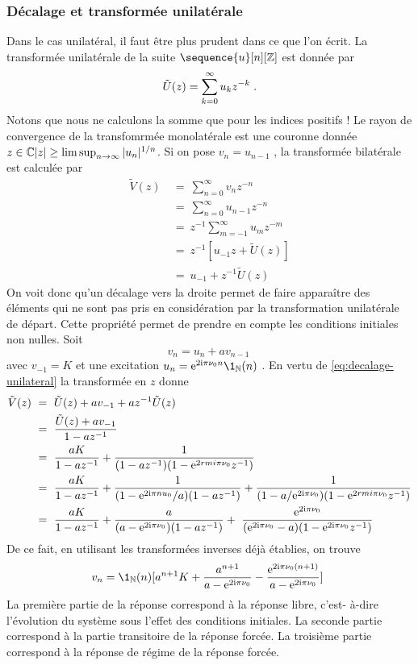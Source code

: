 \begin{proposition}
{\subsubsection{D\'{e}calage et transform\'{e}e unilat\'{e}rale}
Dans le cas unilat\'{e}ral, il faut \^{e}tre plus prudent dans ce que l'on \'{e}crit. La transformée unilatérale de la suite $\sequence{u}[n][\zset]$ est donnée par 
\begin{equation}
\label{eq:transformee-unilaterale}
\tilde{U}(z)= \sum_{k=0}^\infty u_k z^{-k}\;.
\end{equation}
Notons que nous ne calculons la somme que pour les indices positifs ! Le rayon de convergence de la transfomrmée monolatérale est une couronne 
donnée ${z \in \mathbb{C}}{|z| \geq \limsup_{n \to \infty} |u_n|^{1/n}}$. 
Si on pose $v_n=u_{n-1}$ , la transform\'{e}e bilat\'{e}rale est calcul\'{e}e par
\begin{align}
\nonumber
\tilde{V}(z)\ &=\ \sum_{n=0}^{\infty}v_nz^{-n} \\
\nonumber
&=\ \sum_{n=0}^{\infty}u_{n-1}z^{-n} \\
\nonumber
&=\ z^{-1}\sum_{m=-1}^{\infty} u_m z^{-m} \\
\nonumber
&=\ z^{-1}[u_{-1} z+\tilde{U}(z)] \\
&=\ u_{-1}+z^{-1}\tilde{U}(z)
\label{eq:decalage-unilateral}
\end{align}
On voit donc qu'un d\'{e}calage vers la droite permet de faire appara\^{i}tre des \'{e}l\'{e}ments qui ne sont pas pris en consid\'{e}ration par la transformation unilatérale de d\'{e}part. Cette propri\'{e}t\'{e} permet de prendre en compte les conditions initiales non nulles.
Soit
\[
v_n=u_n+av_{n-1}\
\]
avec $v_{-1}=K$ et une excitation $u_n=\rme^{2 \rmi \pi \nu_0 n} \1_{\nset}(n)$ . En vertu de \eqref{eq:decalage-unilateral}
la transform\'{e}e en $z$ donne
\begin{align*}
\tilde{V}(z)\ &=\ \tilde{U}(z)+av_{-1}+az^{-1}\tilde{U}(z) \\
&=\ \frac{\tilde{U}(z)+av_{-1}}{1-az^{-1}} \\
&=\ \frac{aK}{1-az^{-1}}+\frac{1}{(1-az^{-1})(1- \mathrm{e}^{2 rmi \pi \nu_{0}}z^{-1})} \\
& =\ \frac{aK}{1-az^{-1}}+\frac{1}{(1-\mathrm{e}^{2 \mathrm{i} \pi nu_{0}}/a)(1-az^{-1})}
+ \frac{1}{(1-a/\mathrm{e}^{2 \mathrm{i} \pi \nu_{0}})(1-\mathrm{e}^{2 rmi \pi \nu_{0}}z^{-1})} \\
&=\ \frac{aK}{1-az^{-1}}+\frac{a}{(a-\mathrm{e}^{2 \mathrm{i} \pi \nu_{0}})(1-az^{-1})}
+\ \frac{\mathrm{e}^{2 \mathrm{i} \pi \nu_{0}}}{(\mathrm{e}^{2 \mathrm{i} \pi \nu_{0}}-a)(1-\mathrm{e}^{2 \mathrm{i} \pi\nu_{0}}z^{-1})}
\end{align*}
De ce fait, en utilisant les transform\'{e}es inverses d\'{e}j\`{a} \'{e}tablies, on
trouve
\[
v_n=\1_\nset(n)[a^{n+1}K+\frac{a^{n+1}}{a-\rme^{2 \rmi \pi \nu_{0}}}-\frac{\rme^{2 \rmi \pi \nu_{0}(n+1)}}{a-\rme^{2 \rmi \pi \nu_{0}}}]\
\]
La premi\`{e}re partie de la r\'{e}ponse correspond \`{a} la r\'{e}ponse libre, c'est-
\`{a}-dire l'\'{e}volution du syst\`{e}me sous l'effet des conditions initiales.
La seconde partie correspond \`{a} la partie transitoire de la r\'{e}ponse
forc\'{e}e. La troisi\`{e}me partie correspond \`{a} la r\'{e}ponse de r\'{e}gime de la
r\'{e}ponse forc\'{e}e.

}
\end{proposition}
